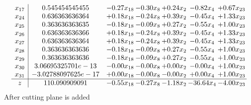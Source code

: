 \documentclass[8pt]{article}
\begin{document}
\[\begin{array}{c| c c@{\hskip 2pt} c@{\hskip 2pt} c@{\hskip 2pt} c@{\hskip 2pt} c@{\hskip 2pt} }
 x_{17}   &  0.545454545455 & -0.27 x_{18} & -0.30 x_{8} & +  0.24 x_{2} & -0.82 x_{4} & +  0.67 x_{23}\\
 x_{24}   &  0.636363636364 & +  0.18 x_{18} & -0.24 x_{8} & +  0.39 x_{2} & -0.45 x_{4} & +  1.33 x_{23}\\
 x_{25}   &  0.363636363635 & -0.18 x_{18} & -0.09 x_{8} & +  0.27 x_{2} & -0.55 x_{4} & +  1.00 x_{23}\\
 x_{26}   &  0.636363636366 & +  0.18 x_{18} & -0.24 x_{8} & +  0.39 x_{2} & -0.45 x_{4} & +  1.33 x_{23}\\
 x_{27}   &  0.636363636364 & +  0.18 x_{18} & -0.24 x_{8} & +  0.39 x_{2} & -0.45 x_{4} & +  1.33 x_{23}\\
 x_{28}   &  0.363636363636 & -0.18 x_{18} & -0.09 x_{8} & +  0.27 x_{2} & -0.55 x_{4} & +  1.00 x_{23}\\
 x_{29}   &  0.363636363636 & -0.18 x_{18} & -0.09 x_{8} & +  0.27 x_{2} & -0.55 x_{4} & +  1.00 x_{23}\\
 x_{30}   &  3.06695325701e-13 & -0.00 x_{18} & -0.00 x_{8} & +  0.00 x_{2} & -0.00 x_{4} & +  1.00 x_{23}\\
 x_{31}   &  -3.02788097625e-17 & +  0.00 x_{18} & -0.00 x_{8} & -0.00 x_{2} & +  0.00 x_{4} & +  1.00 x_{23}\\
\hline
z    &  110.090909091 & -0.55 x_{18} & -0.27 x_{8} & -1.18 x_{2} & -36.64 x_{4} & -4.00 x_{23}\\
\end{array}\]
 After cutting plane is added 
\end{document}
